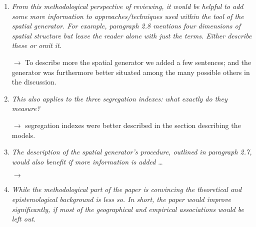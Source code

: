 \documentclass[11pt,a4paper,sans]{moderncv}        %
\begin{document}
\begin{enumerate}
 	\item \textit{From this methodological perspective of reviewing, it would be helpful to add some more information to approaches/techniques used within the tool of the spatial generator. For example, paragraph 2.8 mentions four dimensions of spatial structure but leave the reader alone with just the terms. Either describe these or omit it.}
   
   $\rightarrow$ To describe more the spatial generator we added a few sentences; and the generator was furthermore better situated among the many possible others in the discussion.
	  
  \medskip
  
   \item \textit{This also applies to the three segregation indexes: what exactly do they measure?}
  
  $\rightarrow$ segregation indexes were better described in the section describing the models.
  
  \medskip
  
  \item \textit{The description of the spatial generator’s procedure, outlined in paragraph 2.7, would also benefit if more information is added} \ldots
  
  $\rightarrow$ 

  \medskip

  \item \textit{While the methodological part of the paper is convincing the theoretical and epistemological background is less so. In short, the paper would improve significantly, if most of the geographical and empirical associations would be left out.}
   

\end{enumerate}
\end{document}
